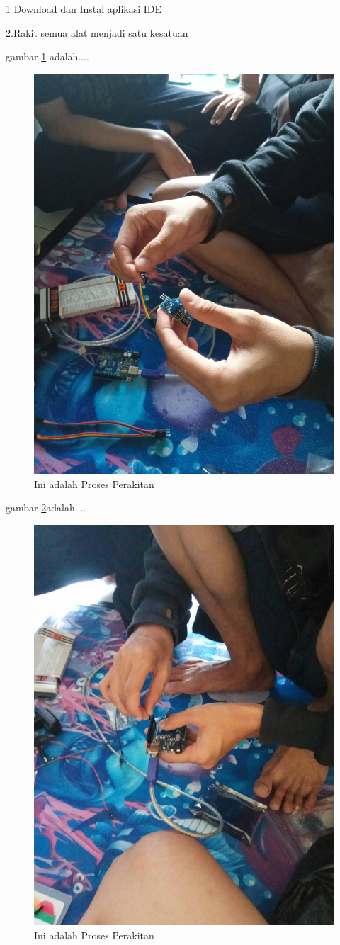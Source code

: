 1 Download dan Instal aplikasi IDE

2.Rakit semua alat menjadi satu kesatuan

  gambar \ref{ar2} adalah....
  \begin{figure}[ht]
  \centerline{\includegraphics[width=.75\textwidth]{figures/ar2.jpg}}
  \caption{Ini adalah Proses Perakitan}
  \label{ar2}
  \end{figure}

  gambar \ref{ar3}adalah....
  \begin{figure}[ht]
  \centerline{\includegraphics[width=.75\textwidth]{figures/ar3.jpg}}
  \caption{Ini adalah Proses Perakitan}
  \label{ar3}
  \end{figure}

